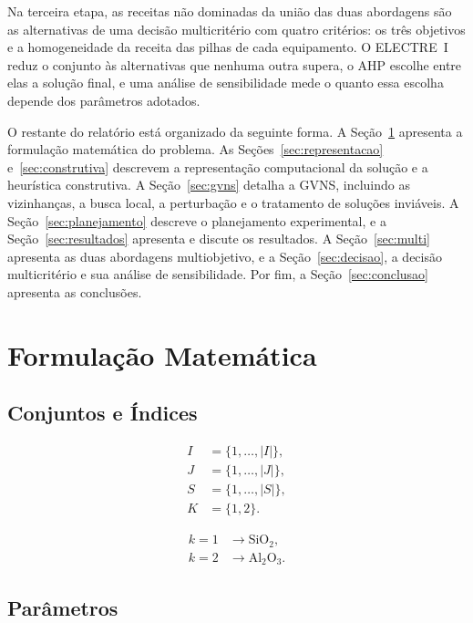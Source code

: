 \documentclass[conference]{IEEEtran}
\begin{document}
Na terceira etapa, as receitas não dominadas da união das duas abordagens são as alternativas de uma decisão multicritério com quatro critérios: os três objetivos e a homogeneidade da receita das pilhas de cada equipamento. O ELECTRE~I reduz o conjunto às alternativas que nenhuma outra supera, o AHP escolhe entre elas a solução final, e uma análise de sensibilidade mede o quanto essa escolha depende dos parâmetros adotados.

O restante do relatório está organizado da seguinte forma. A Seção~\ref{sec:formulacao} apresenta a formulação matemática do problema. As Seções~\ref{sec:representacao} e~\ref{sec:construtiva} descrevem a representação computacional da solução e a heurística construtiva. A Seção~\ref{sec:gvns} detalha a GVNS, incluindo as vizinhanças, a busca local, a perturbação e o tratamento de soluções inviáveis. A Seção~\ref{sec:planejamento} descreve o planejamento experimental, e a Seção~\ref{sec:resultados} apresenta e discute os resultados. A Seção~\ref{sec:multi} apresenta as duas abordagens multiobjetivo, e a Seção~\ref{sec:decisao}, a decisão multicritério e sua análise de sensibilidade. Por fim, a Seção~\ref{sec:conclusao} apresenta as conclusões.

\section{Formulação Matemática}\label{sec:formulacao}

\subsection{Conjuntos e Índices}

\begin{align}
I &= \{1,\ldots,|I|\}, \\
J &= \{1,\ldots,|J|\}, \\
S &= \{1,\ldots,|S|\}, \\
K &= \{1,2\}.
\end{align}

\begin{align}
k=1 &\rightarrow \mathrm{SiO_2}, \\
k=2 &\rightarrow \mathrm{Al_2O_3}.
\end{align}

\subsection{Parâmetros}
\end{document}

